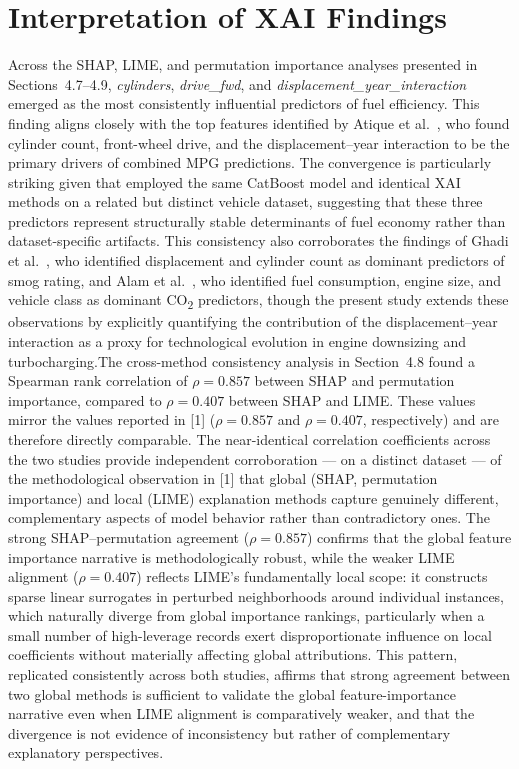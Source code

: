 \section{Interpretation of XAI Findings}

Across the SHAP, LIME, and permutation importance analyses presented in Sections~4.7--4.9, \textit{cylinders}, \textit{drive\_fwd}, and \textit{displacement\_year\_interaction} emerged as the most consistently influential predictors of fuel efficiency. This finding aligns closely with the top features identified by Atique et al.~\cite{atique2026explainable}, who found cylinder count, front-wheel drive, and the displacement--year interaction to be the primary drivers of combined MPG predictions. The convergence is particularly striking given that \cite{atique2026explainable} employed the same CatBoost model and identical XAI methods on a related but distinct vehicle dataset, suggesting that these three predictors represent structurally stable determinants of fuel economy rather than dataset-specific artifacts. This consistency also corroborates the findings of Ghadi et al.~\cite{ghadi2025explainable}, who identified displacement and cylinder count as dominant predictors of smog rating, and Alam et al.~\cite{alam2025deep}, who identified fuel consumption, engine size, and vehicle class as dominant CO\textsubscript{2} predictors, though the present study extends these observations by explicitly quantifying the contribution of the displacement--year interaction as a proxy for technological evolution in engine downsizing and turbocharging.The cross-method consistency analysis in Section~4.8 found a Spearman rank correlation of \(\rho = 0.857\) between SHAP and permutation importance, compared to \(\rho = 0.407\) between SHAP and LIME. These values mirror the values reported in [1] (\(\rho = 0.857\) and \(\rho = 0.407\), respectively) and are therefore directly comparable. The near-identical correlation coefficients across the two studies provide independent corroboration --- on a distinct dataset --- of the methodological observation in [1] that global (SHAP, permutation importance) and local (LIME) explanation methods capture genuinely different, complementary aspects of model behavior rather than contradictory ones. The strong SHAP--permutation agreement (\(\rho = 0.857\)) confirms that the global feature importance narrative is methodologically robust, while the weaker LIME alignment (\(\rho = 0.407\)) reflects LIME's fundamentally local scope: it constructs sparse linear surrogates in perturbed neighborhoods around individual instances, which naturally diverge from global importance rankings, particularly when a small number of high-leverage records exert disproportionate influence on local coefficients without materially affecting global attributions. This pattern, replicated consistently across both studies, affirms that strong agreement between two global methods is sufficient to validate the global feature-importance narrative even when LIME alignment is comparatively weaker, and that the divergence is not evidence of inconsistency but rather of complementary explanatory perspectives.


